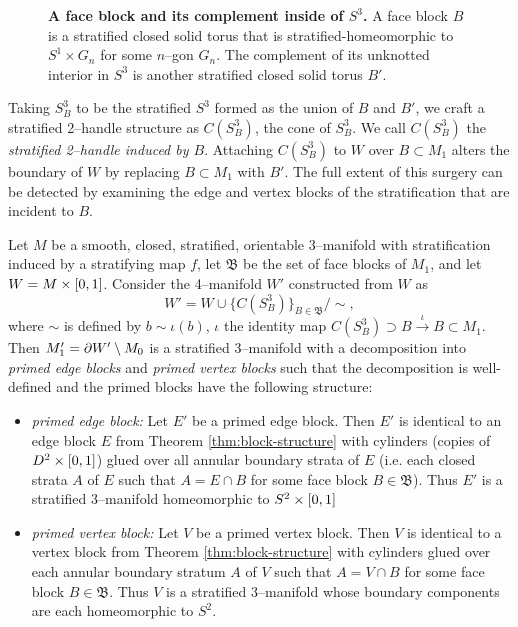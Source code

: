 \begin{figure}[h!]
	\caption{
		\textbf{A face block and its complement inside of $S^3$.}
		A face block $B$ is a stratified closed solid torus that is stratified-homeomorphic to $S^1\times G_n$ for some $n$--gon $G_n$.
		The complement of its unknotted interior in $S^3$ is another stratified closed solid torus $B'$.
	}
	\label{fig:face-block-complement}
\end{figure}

Taking $S_B^3$ to be the stratified $S^3$ formed as the union of $B$ and $B'$, we craft a stratified 2--handle structure as $C(S_B^3)$, the cone of $S_B^3$.
We call $C(S_B^3)$ the \emph{stratified 2--handle induced by $B$}.
Attaching $C(S_B^3)$ to $W$ over $B\subset M_1$ alters the boundary of $W$ by replacing $B\subset M_1$ with $B'$.
The full extent of this surgery can be detected by examining the edge and vertex blocks of the stratification that are incident to $B$.

\begin{theorem}
	\label{thm:primed-block-structure}
	Let $M$ be a smooth, closed, stratified, orientable 3--manifold with stratification induced by a stratifying map $f$, let $\mathfrak{B}$ be the set of face blocks of $M_1$, and let $W=M\times[0,1]$.
	Consider the 4--manifold $W'$ constructed from $W$ as
	\[
		W' = W\cup\{C(S_B^3)\}_{B\in \mathfrak{B}} / \sim,
	\]
	where $\sim$ is defined by $b\sim \iota(b)$, $\iota$ the identity map $C(S_B^3)\supset B\overset{\iota}{\to} B\subset M_1$.
	Then $M_1'=\partial W'\setminus M_0$ is a stratified 3--manifold with a decomposition into \emph{primed edge blocks} and \emph{primed vertex blocks} such that the decomposition is well-defined and the primed blocks have the following structure:
	\begin{itemize}
		\item \emph{primed edge block:}
		Let $E'$ be a primed edge block.
		Then $E'$ is identical to an edge block $E$ from Theorem \ref{thm:block-structure} with cylinders (copies of $D^2\times[0,1]$) glued over all annular boundary strata of $E$ (i.e. each closed strata $A$ of $E$ such that $A=E\cap B$ for some face block $B\in\mathfrak{B}$).
		Thus $E'$ is a stratified 3--manifold homeomorphic to $S^2\times[0,1]$
		
		\item \emph{primed vertex block:}
		Let $V$ be a primed vertex block.
		Then $V$ is identical to a vertex block from Theorem \ref{thm:block-structure} with cylinders glued over each annular boundary stratum $A$ of $V$ such that $A=V\cap B$ for some face block $B\in\mathfrak{B}$.
		Thus $V$ is a stratified 3--manifold whose boundary components are each homeomorphic to $S^2$.
	\end{itemize}
\end{theorem}


